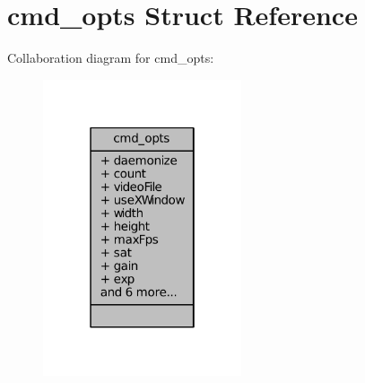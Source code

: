 \hypertarget{structcmd__opts}{\section{cmd\+\_\+opts Struct Reference}
\label{structcmd__opts}
}


Collaboration diagram for cmd\+\_\+opts\+:
\nopagebreak
\begin{figure}[H]
\begin{center}
\leavevmode
\includegraphics[width=166pt]{structcmd__opts__coll__graph}
\end{center}
\end{figure}
